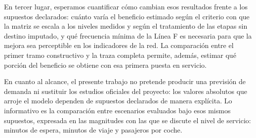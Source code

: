 \documentclass{article}
\begin{document}
En tercer lugar, esperamos cuantificar cómo cambian esos resultados frente a los supuestos declarados:
cuánto varía el beneficio estimado según el criterio con que la matriz se escala a los niveles medidos y
según el tratamiento de las etapas sin destino imputado, y qué frecuencia mínima de la Línea F es necesaria
para que la mejora sea perceptible en los indicadores de la red. La comparación entre el primer tramo
constructivo y la traza
completa permite, además, estimar qué porción del beneficio se obtiene con esa primera puesta en servicio.

En cuanto al alcance, el presente trabajo no pretende producir una previsión de demanda ni sustituir los
estudios oficiales del proyecto: los valores absolutos que arroje el modelo dependen de supuestos
declarados de manera explícita. Lo informativo es la comparación entre escenarios evaluados bajo esos
mismos supuestos, expresada en las magnitudes con las que se discute el nivel de servicio: minutos de
espera, minutos de viaje y pasajeros por coche.

\end{document}
